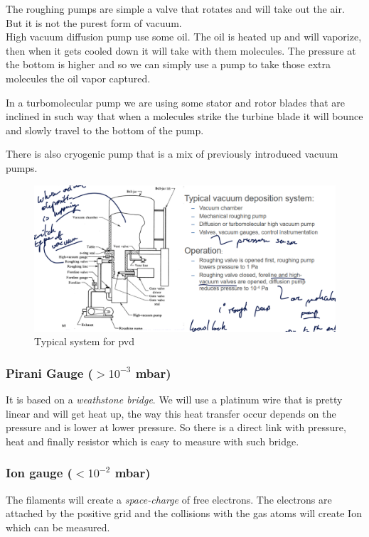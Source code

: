 \documentclass{report}
\begin{document}
The roughing pumps are simple a valve that rotates and will take out the air. But it is not the purest form of vacuum.\\

High vacuum diffusion pump use some oil. The oil is heated up and will vaporize, then when it gets cooled down it will take with them molecules. The pressure at the bottom is higher and so we can simply use a pump to take those extra molecules the oil vapor captured.

In a turbomolecular pump we are using some stator and rotor blades that are inclined in such way that when a molecules strike the turbine blade it will bounce and slowly travel to the bottom of the pump.

There is also cryogenic pump that is a mix of previously introduced vacuum pumps.

\begin{figure}[H]
    \centering
    \includegraphics[width=0.75\linewidth]{Vacuum_PVD.png}
    \caption{Typical system for \gls{pvd}}
    \label{fig:PVD-label}
\end{figure}

\subsubsection{Pirani Gauge ($> 10^{-3}$ mbar)}

It is based on a \textit{weathstone bridge}. We will use a platinum wire that is pretty linear and will get heat up, the way this heat transfer occur depends on the pressure and is lower at lower pressure. So there is a direct link with pressure, heat and finally resistor which is easy to measure with such bridge.

\subsubsection{Ion gauge ($< 10^{-2}$ mbar) }

The filaments will create a \textit{space-charge} of free electrons. The electrons are attached by the positive grid and the collisions with the gas atoms will create Ion which can be measured.
\end{document}
